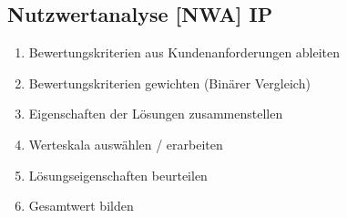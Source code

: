 \subsection{Nutzwertanalyse [NWA] \hfill IP}
\begin{scriptsize}
    \begin{enumerate}
        \item Bewertungskriterien aus Kundenanforderungen ableiten
        \item Bewertungskriterien gewichten (Binärer Vergleich)
        \item Eigenschaften der Lösungen zusammenstellen
        \item Werteskala auswählen / erarbeiten
        \item Lösungseigenschaften beurteilen
        \item Gesamtwert bilden
    \end{enumerate}
\end{scriptsize}